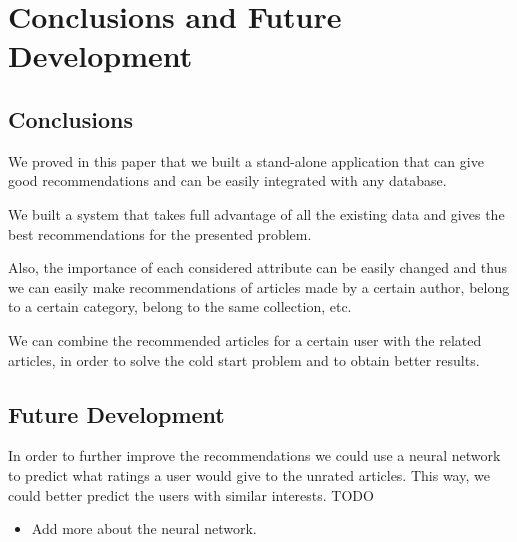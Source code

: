 \chapter{Conclusions and Future Development}
\label{chapter:conclusions-future-development}

\section{Conclusions} 
\label{sec:conclusions}
We proved in this paper that we built a stand-alone application that can give good recommendations and can be easily integrated with any database.

We built a system that takes full advantage of all the existing data and gives the best recommendations for the presented problem.

Also, the importance of each considered attribute can be easily changed and thus we can easily make recommendations of articles made by a certain author, belong to a certain category, belong to the same collection, etc. 

We can combine the recommended articles for a certain user with the related articles, in order to solve the cold start problem and to obtain better results.

\section{Future Development} 
\label{sec:future-development}

In order to further improve the recommendations we could use a neural network to predict what ratings a user would give to the unrated articles. This way, we could better predict the users with similar interests.
TODO
\begin{itemize}
	\item Add more about the neural network.	
\end{itemize}
